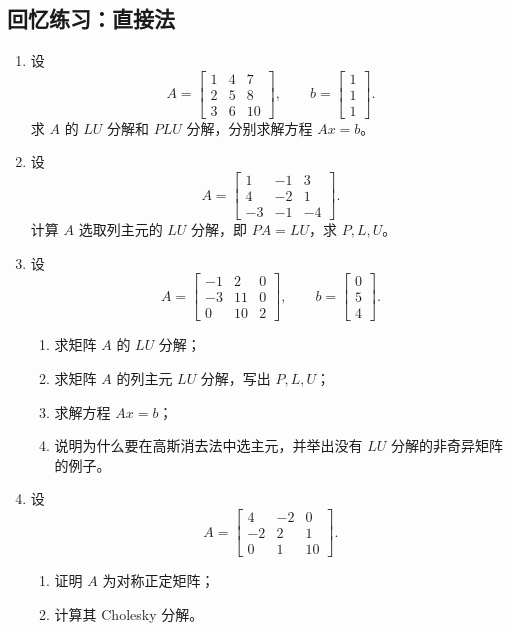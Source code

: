 \documentclass{article}
\begin{document}
\subsection{回忆练习：直接法}

\begin{enumerate}
  \item 设
  \[
    A=\begin{bmatrix}1&4&7\\2&5&8\\3&6&10\end{bmatrix},\qquad
    b=\begin{bmatrix}1\\1\\1\end{bmatrix}.
  \]
  求 $A$ 的 $LU$ 分解和 $PLU$ 分解，分别求解方程 $Ax=b$。

  \item 设
  \[
    A=\begin{bmatrix}1&-1&3\\4&-2&1\\-3&-1&-4\end{bmatrix}.
  \]
  计算 $A$ 选取列主元的 $LU$ 分解，即 $PA=LU$，求 $P,L,U$。

  \item 设
  \[
    A=\begin{bmatrix}-1&2&0\\-3&11&0\\0&10&2\end{bmatrix},\qquad
    b=\begin{bmatrix}0\\5\\4\end{bmatrix}.
  \]
  \begin{enumerate}[(1)]
    \item 求矩阵 $A$ 的 $LU$ 分解；
    \item 求矩阵 $A$ 的列主元 $LU$ 分解，写出 $P,L,U$；
    \item 求解方程 $Ax=b$；
    \item 说明为什么要在高斯消去法中选主元，并举出没有 $LU$ 分解的非奇异矩阵的例子。
  \end{enumerate}

  \item 设
  \[
    A=\begin{bmatrix}4&-2&0\\-2&2&1\\0&1&10\end{bmatrix}.
  \]
  \begin{enumerate}[(1)]
    \item 证明 $A$ 为对称正定矩阵；
    \item 计算其 Cholesky 分解。
  \end{enumerate}


\end{enumerate}
\end{document}

